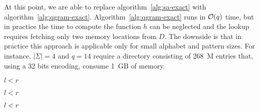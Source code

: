 At this point, we are able to replace algorithm~\ref{alg:sa-exact} with algorithm~\ref{alg:qgram-exact}.
Algorithm~\ref{alg:qgram-exact} runs in $\mathcal{O}(q)$ time, but in practice the time to compute the function $h$ can be neglected and the lookup requires fetching only two memory locations from $D$.
The downside is that in practice this approach is applicable only for small alphabet and pattern sizes.
For instance, $|\Sigma| = 4$ and $q=14$ require a directory consisting of 268~M entries that, using a 32 bits encoding, consume 1~GB of memory.

\begin{algorithm}[h!]
\begin{minipage}[t]{.5\textwidth}
\label{alg:qgram-godownc}
\begin{algorithmic}[1]
		\State \Return \False
	\EndIf
	\State \Return $l < r$
\EndProcedure
\end{algorithmic}
\end{minipage}
\end{algorithm}

\begin{algorithm}[h!]
\begin{minipage}[t]{.5\textwidth}
\label{alg:qgram-godown}
\begin{algorithmic}[1]
		\State \Return \False
	\EndIf
	\EndWhile
	\State \Return $l < r$
\EndProcedure
\end{algorithmic}
\end{minipage}
\begin{minipage}[t]{.5\textwidth}
\label{alg:qgram-goright}
\begin{algorithmic}[1]
		\State \Return \False
	\EndIf
	\Repeat
	\Until {}	
	\State \Return $l < r$
\EndProcedure
\end{algorithmic}
\end{minipage}
\end{algorithm}

